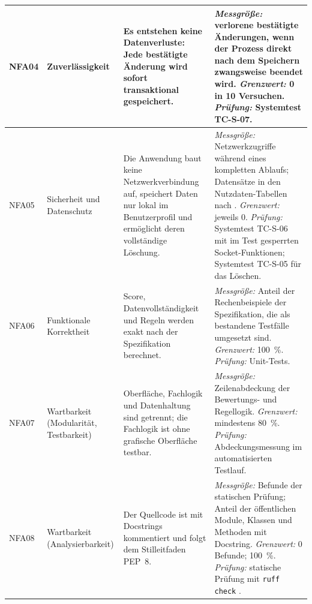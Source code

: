 \begin{longtable}{@{}L{1.2cm}L{3.0cm}L{5.9cm}L{5.1cm}@{}}
  \midrule
  NFA04 & Zuverlässigkeit
    & Es entstehen keine Datenverluste: Jede bestätigte Änderung wird sofort transaktional gespeichert.
    & \textit{Messgröße:} verlorene bestätigte Änderungen, wenn der Prozess direkt nach dem Speichern zwangsweise beendet wird.\newline
      \textit{Grenzwert:} 0 in 10 Versuchen.\newline
      \textit{Prüfung:} Systemtest TC-S-07. \\
  \midrule
  NFA05 & Sicherheit und Datenschutz
    & Die Anwendung baut keine Netzwerkverbindung auf, speichert Daten nur lokal im Benutzerprofil und ermöglicht deren vollständige Löschung.
    & \textit{Messgröße:} Netzwerkzugriffe während eines kompletten Ablaufs; Datensätze in den Nutzdaten-Tabellen nach .\newline
      \textit{Grenzwert:} jeweils 0.\newline
      \textit{Prüfung:} Systemtest TC-S-06 mit im Test gesperrten Socket-Funktionen; Systemtest TC-S-05 für das Löschen. \\
  \midrule
  NFA06 & Funktionale Korrektheit
    & Score, Datenvollständigkeit und Regeln werden exakt nach der Spezifikation berechnet.
    & \textit{Messgröße:} Anteil der Rechenbeispiele der Spezifikation, die als bestandene Testfälle umgesetzt sind.\newline
      \textit{Grenzwert:} 100~\%.\newline
      \textit{Prüfung:} Unit-Tests. \\
  \midrule
  NFA07 & Wartbarkeit (Modularität, Testbarkeit)
    & Oberfläche, Fachlogik und Datenhaltung sind getrennt; die Fachlogik ist ohne grafische Oberfläche testbar.
    & \textit{Messgröße:} Zeilenabdeckung der Bewertungs- und Regellogik.\newline
      \textit{Grenzwert:} mindestens 80~\%.\newline
      \textit{Prüfung:} Abdeckungsmessung im automatisierten Testlauf. \\
  \midrule
  NFA08 & Wartbarkeit (Analysier\-barkeit)
    & Der Quellcode ist mit Docstrings kommentiert und folgt dem Stilleitfaden \ac{PEP}~8.
    & \textit{Messgröße:} Befunde der statischen Prüfung; Anteil der öffentlichen Module, Klassen und Methoden mit Docstring.\newline
      \textit{Grenzwert:} 0 Befunde; 100~\%.\newline
      \textit{Prüfung:} statische Prüfung mit \texttt{ruff check} \parencite{ruff}. \\

\end{longtable}
